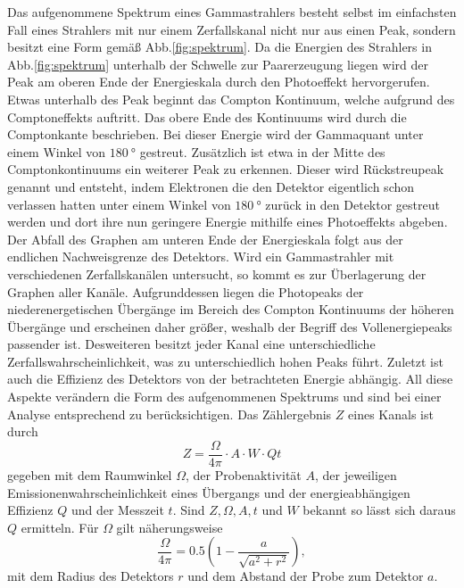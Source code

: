 Das aufgenommene Spektrum eines Gammastrahlers besteht selbst im einfachsten Fall eines Strahlers mit nur einem Zerfallskanal nicht nur aus einen Peak, sondern besitzt eine Form gemäß Abb.\ref{fig:spektrum}. Da die Energien des Strahlers in Abb.\ref{fig:spektrum} unterhalb der Schwelle zur Paarerzeugung liegen wird der Peak am oberen Ende der Energieskala durch den Photoeffekt hervorgerufen. Etwas unterhalb des Peak beginnt das Compton Kontinuum, welche aufgrund des Comptoneffekts auftritt. Das obere Ende des Kontinuums wird durch die Comptonkante beschrieben. Bei dieser Energie wird der Gammaquant unter einem Winkel von $\SI{180}{\degree}$ gestreut. Zusätzlich ist etwa in der Mitte des Comptonkontinuums ein weiterer Peak zu erkennen. Dieser wird Rückstreupeak genannt und entsteht, indem Elektronen die den Detektor eigentlich schon verlassen hatten unter einem Winkel von $\SI{180}{\degree}$ zurück in den Detektor gestreut werden und dort ihre nun geringere Energie mithilfe eines Photoeffekts abgeben. Der Abfall des Graphen am unteren Ende der Energieskala folgt aus der endlichen Nachweisgrenze des Detektors. Wird ein Gammastrahler mit verschiedenen Zerfallskanälen untersucht, so kommt es zur Überlagerung der Graphen aller Kanäle. Aufgrunddessen liegen die Photopeaks der niederenergetischen Übergänge im Bereich des Compton Kontinuums der höheren Übergänge und erscheinen daher größer, weshalb der Begriff des Vollenergiepeaks passender ist. Desweiteren besitzt jeder Kanal eine unterschiedliche Zerfallswahrscheinlichkeit, was zu unterschiedlich hohen Peaks führt. Zuletzt ist auch die Effizienz des Detektors von der betrachteten Energie abhängig. All diese Aspekte verändern die Form des aufgenommenen Spektrums und sind bei einer Analyse entsprechend zu berücksichtigen. Das Zählergebnis $Z$ eines Kanals ist durch
\begin{equation}
    Z = \frac{\Omega}{4 \pi}\cdot A \cdot W \cdot Q t \label{eq:ZZZ}
\end{equation}
gegeben mit dem Raumwinkel $\Omega$, der Probenaktivität $A$, der jeweiligen Emissionenwahrscheinlichkeit eines Übergangs und der energieabhängigen Effizienz $Q$ und der Messzeit $t$. Sind $Z,\Omega,A,t$ und $W$ bekannt so lässt sich daraus $Q$ ermitteln. Für $\Omega$ gilt näherungsweise
\begin{equation}
    \frac{\Omega}{4 \pi} = 0.5 \left( 1- \frac{a}{\sqrt{a^2 + r^2}}\right) ,\label{eq:omega}
\end{equation}
mit dem Radius des Detektors $r$ und dem Abstand der Probe zum Detektor $a$.  